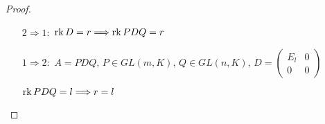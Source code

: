 \begin{proof}
    \
    \begin{itemize}
        \item[$2 \Rightarrow 1:$] $\operatorname{rk} D = r \Longrightarrow \operatorname{rk} PDQ = r$
        \item[$1 \Rightarrow 2:$] $A = PDQ,\, P \in GL(m, K),\, Q \in GL(n, K),\, D =
        \begin{pmatrix}
            E_l & 0\\
            0 & 0
        \end{pmatrix}$
    
            $\operatorname{rk} PDQ = l \Longrightarrow r = l$
    \end{itemize}

\end{proof}


